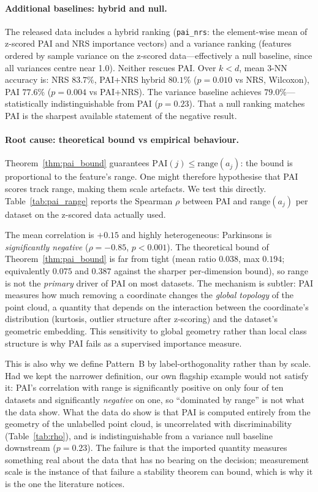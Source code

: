 \paragraph{Additional baselines: hybrid and null.}
The released data includes a hybrid ranking (\texttt{pai\_nrs}: the
element-wise mean of z-scored PAI and NRS importance vectors) and a variance
ranking (features ordered by sample variance on the z-scored data---effectively
a null baseline, since all variances centre near 1.0).  Neither rescues PAI.
Over $k < d$, mean 3-NN accuracy is: NRS $83.7\%$, PAI+NRS hybrid $80.1\%$
($p = 0.010$ vs NRS, Wilcoxon), PAI $77.6\%$ ($p = 0.004$ vs PAI+NRS).
The variance baseline achieves $79.0\%$---statistically indistinguishable
from PAI ($p = 0.23$).  That a null ranking matches PAI is the sharpest
available statement of the negative result.

\paragraph{Root cause: theoretical bound vs empirical behaviour.}
Theorem~\ref{thm:pai_bound} guarantees $\mathrm{PAI}(j) \leq \mathrm{range}(a_j)$:
the bound is proportional to the feature's range.  One might therefore
hypothesise that PAI scores track range, making them scale artefacts.
We test this directly.  Table~\ref{tab:pai_range} reports the Spearman
$\rho$ between PAI and $\mathrm{range}(a_j)$ per dataset on the z-scored
data actually used.



The mean correlation is $+0.15$ and highly heterogeneous: Parkinsons is
\emph{significantly negative} ($\rho = -0.85$, $p < 0.001$).  The
theoretical bound of Theorem~\ref{thm:pai_bound} is far from tight
(mean ratio $0.038$, max $0.194$; equivalently $0.075$ and $0.387$ against
the sharper per-dimension bound), so range is not the \emph{primary} driver
of PAI on most datasets.  The
mechanism is subtler: PAI measures how much removing a coordinate
changes the \emph{global topology} of the point cloud, a quantity that
depends on the interaction between the coordinate's distribution (kurtosis,
outlier structure after z-scoring) and the dataset's geometric embedding.
This sensitivity to global geometry rather than local class structure is why
PAI fails as a supervised importance measure.

This is also why we define Pattern~B by label-orthogonality rather than by
scale.  Had we kept the narrower definition, our own flagship example would
not satisfy it: PAI's correlation with range is significantly positive on
only four of ten datasets and significantly \emph{negative} on one, so
``dominated by range'' is not what the data show.  What the data do show is
that PAI is computed entirely from the geometry of the unlabelled point
cloud, is uncorrelated with discriminability (Table~\ref{tab:rho}), and is
indistinguishable from a variance null baseline downstream ($p=0.23$).  The
failure is that the imported quantity measures something real about the data
that has no bearing on the decision; measurement scale is the instance of
that failure a stability theorem can bound, which is why it is the one the
literature notices.

